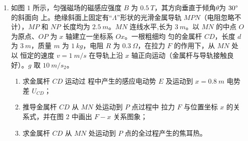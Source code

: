 \begin{enumerate}
\item 
{}
如图 $ 1 $ 所示，匀强磁场的磁感应强度 $ B $ 为 $ 0.5 \ T $，其方向垂直于倾角$ \theta $为 $ 30 \degree $ 的斜面向
上。绝缘斜面上固定有“$ \Lambda $”形状的光滑金属导轨 $ MPN $（电阻忽略不计），$ MP $ 和 $ NP $ 长度均为
$ 2.5 \ m $。$ MN $ 连线水平,长为 $ 3 \ m $。以 $ MN $ 的中点 $ O $ 为原点、$ OP $ 为 $ x $ 轴建立一坐标系 $ Ox $。一根粗细均
匀的金属杆 $ CD $，长度 $ d $ 为 $ 3 \ m $，质量 $ m $ 为 $ 1 \ kg $，电阻 $ R $ 为 $ 0.3 \ \Omega $，在拉力 $ F $ 的作用下，从 $ MN $ 处以
恒定的速度 $ v=1 \ m /s $ 在导轨上沿 $ x $ 轴正向运动（金属杆与导轨接触良好）。$ g $ 取 $ 10 \ m / s_{2} $。
\begin{enumerate}
\item
求金属杆 $ CD $ 运动过
程中产生的感应电动势 $ E $
及运动到 $ x=0.8 \ m $ 电势差
$ U_{CD} $；


\item 
推导金属杆 $ CD $ 从
$ MN $ 处运动到 $ P $ 点过程中
拉力 $ F $ 与位置坐标 $ x $ 的关系式，并在图 $ 2 $ 中画出 $ F-x $ 关系图象；
\item 
求金属杆 $ CD $ 从 $ MN $ 处运动到 $ P $ 点的全过程产生的焦耳热。


\end{enumerate}
\begin{figure}[h!]
\flushright 
\begin{subfigure}{0.4\linewidth}
\centering
 
\caption{}\label{}
\end{subfigure}
\begin{subfigure}{0.4\linewidth}
\centering
 
\caption{}\label{}
\end{subfigure}
\end{figure}



\end{enumerate}
